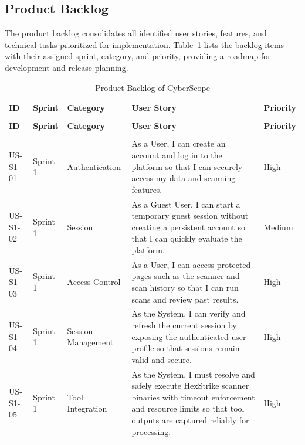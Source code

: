 \subsection{Product Backlog}

\indent\justifying The product backlog consolidates all identified user stories, features, and technical tasks prioritized for implementation. Table~\ref{tab:product-backlog} lists the backlog items with their assigned sprint, category, and priority, providing a roadmap for development and release planning.


    {\small
    \begin{longtable}{|>{\centering\arraybackslash}p{1.4cm}|>{\centering\arraybackslash}p{2cm}|>{\centering\arraybackslash}p{2.2cm}|>{\raggedright\arraybackslash}p{7.5cm}|>{\centering\arraybackslash}p{1.2cm}|}
        \caption{Product Backlog of CyberScope}
        \label{tab:product-backlog} \\
        \hline
        \textbf{ID} & \textbf{Sprint} & \textbf{Category} & \textbf{User Story} & \textbf{Priority} \\
        \hline
        \endfirsthead
        \multicolumn{5}{c}{\textit{}} \\
        \hline
        \textbf{ID} & \textbf{Sprint} & \textbf{Category} & \textbf{User Story} & \textbf{Priority} \\
        \hline
        \endhead
        \hline
        \multicolumn{5}{r}{\textit{continued on next page}} \\
        \endfoot
        \hline
        \endlastfoot
        US-S1-01 & Sprint 1 & Authentication & As a User, I can create an account and log in to the platform so that I can securely access my data and scanning features. & High \\
        \hline
        US-S1-02 & Sprint 1 & Session & As a Guest User, I can start a temporary guest session without creating a persistent account so that I can quickly evaluate the platform. & Medium \\
        \hline
        US-S1-03 & Sprint 1 & Access Control & As a User, I can access protected pages such as the scanner and scan history so that I can run scans and review past results. & High \\
        \hline
        US-S1-04 & Sprint 1 & Session Management & As the System, I can verify and refresh the current session by exposing the authenticated user profile so that sessions remain valid and secure. & High \\
        \hline
        US-S1-05 & Sprint 1 & Tool Integration & As the System, I must resolve and safely execute HexStrike scanner binaries with timeout enforcement and resource limits so that tool outputs are captured reliably for processing. & High \\

\end{longtable}}

